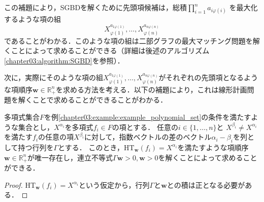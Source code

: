 この補題により，SGBDを解くために先頭項候補は，総積$\displaystyle \prod_{i=1}^n a_{i\varphi(i)}$
を最大化するような項の組
$$X_{\varphi(1)}^{a_{1\varphi(1)}}, \dots, X_{\varphi(n)}^{a_{n\varphi(n)}}$$
であることがわかる．このような項の組は二部グラフの最大マッチング問題を解くことによって求めることができる（詳細は後述のアルゴリズム\ref{chapter03:algorithm:SGBD}を参照）．
\par
次に，実際にそのような項の組$X_{\varphi(1)}^{a_{1\varphi(1)}}, \dots, X_{\varphi(n)}^{a_{n\varphi(n)}}$がそれぞれの先頭項となるような項順序$\bm{w} \in \mathbb{R}_{+}^n$を求める方法を考える．以下の補題により，これは線形計画問題を解くことで求めることができることがわかる．
\begin{lemma}
	\label{chapter03:lemmma:lin_prog}
	多項式集合$F$を例\ref{chapter03:example:example_polynomial_set}の条件を満たすような集合とし，$X^{\alpha_i}$を多項式$f_i \in F$の項とする．
	任意の$i \in \{1, \dots, n\}$と
	$X^{\beta_i} \ne X^{\alpha_i}$を満たす$f_i$の任意の項$X^{\beta_i}$に対して，指数ベクトルの差のベクトル$\alpha_i - \beta_i$を列として持つ行列を$\varGamma$とする．
	このとき，$\mathrm{HT}_{\bm{w}}(f_i) = X^{\alpha_i}$を満たすような項順序$\bm{w} \in \mathbb{R}_{+}^n$が唯一存在し，連立不等式$\varGamma \bm{w} > 0, \bm{w} > 0$を解くことによって求めることができる．
\end{lemma}
\begin{proof}
	$\mathrm{HT}_{\bm{w}}(f_i) = X^{\alpha_i}$という仮定から，行列$\varGamma$と$\bm{w}$との積は正となる必要がある．
\end{proof}

